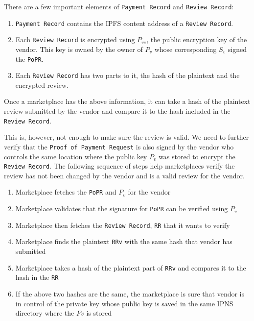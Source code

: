 \documentclass[a4paper]{article}
\begin{document}
There are a few important elements of \texttt{Payment Record} and
\texttt{Review Record}:

\begin{enumerate}
\item \texttt{Payment Record} contains the IPFS content address of a
  \texttt{Review Record}.
  
\item Each \texttt{Review Record} is encrypted using $P_{ve}$, the
  public encryption key of the vendor. This key is owned by the owner
  of $P_v$ whose corresponding $S_v$ signed the \texttt{PoPR}.

\item Each \texttt{Review Record} has two parts to it, the hash of the
  plaintext and the encrypted review.
\end{enumerate}

Once a marketplace has the above information, it can take a hash of
the plaintext review submitted by the vendor and compare it to the
hash included in the \texttt{Review Record}.

This is, however, not enough to make sure the review is valid. We need
to further verify that the \texttt{Proof of Payment Request} is also
signed by the vendor who controls the same location where the public
key $P_v$ was stored to encrypt the \texttt{Review Record}. The
following sequence of steps help marketplaces verify the review has
not been changed by the vendor and is a valid review for the vendor.

\begin{enumerate}
\item Marketplace fetches the \texttt{PoPR} and $P_v$ for the vendor
\item Marketplace validates that the signature for \texttt{PoPR} can be
  verified using $P_v$
\item Marketplace then fetches the \texttt{Review Record}, \texttt{RR}
  that it wants to verify
\item Marketplace finds the plaintext \texttt{RRv} with the same hash that
  vendor has submitted
\item Marketplace takes a hash of the plaintext part of \texttt{RRv}
  and compares it to the hash in the \texttt{RR}
\item If the above two hashes are the same, the marketplace is sure
  that vendor is in control of the private key whose public key is
  saved in the same IPNS directory where the $Pv$ is stored
\end{enumerate}
\end{document}
